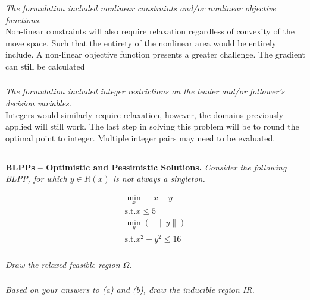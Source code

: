 \documentclass[12pt]{amsart}
\begin{document}
% 
% 

\subsubsection{}
\textit{The formulation included nonlinear constraints and/or nonlinear objective functions.} \\

Non-linear constraints will also require relaxation regardless of convexity of the move space.
Such that the entirety of the nonlinear area would be entirely include. 
A non-linear objective function presents a greater challenge. 
The gradient can still be calculated

\subsubsection{}
\textit{The formulation included integer restrictions on the leader and/or follower’s decision variables.} \\

Integers would similarly require relaxation, however, the domains previously applied will still work.
The last step in solving this problem will be to round the optimal point to integer.
Multiple integer pairs may need to be evaluated.

\subsection{}
\textbf{BLPPs – Optimistic and Pessimistic Solutions.} 
\textit{Consider the following BLPP, for which $y\in R(x)$ is not always a singleton.}

\begin{align*}
	\min_x	-x-y \\
	\text{s.t.}	x \leq 5 \\
	\min_y	(-\|y\|) \\
	\text{s.t.}	x^2 + y^2 \leq 16
\end{align*}

% 
% 

\subsubsection{}
\textit{Draw the relaxed feasible region $\Omega$.}

\subsubsection{}
\textit{Based on your answers to (a) and (b), draw the inducible region IR.}
\end{document}
